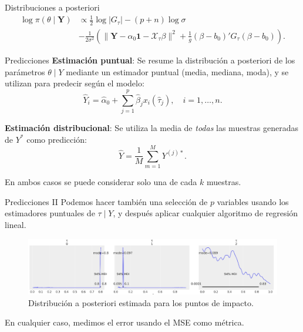 \documentclass[10pt, spanish, professionalfonts]{beamer}
\begin{document}
\begin{frame}{Distribuciones a posteriori}
  \begin{align*}
  \log \pi(\theta\mid \boldsymbol{Y}) &\propto \frac{1}{2}\log |G_\tau| - (p+n)\log \sigma\\
  &-\frac{1}{2\sigma^2} \left(\|\boldsymbol{Y}-\alpha_0\boldsymbol{1} - \mathcal X_\tau\beta\|^2 + \frac{1}{g}(\beta - b_0)'G_\tau(\beta - b_0) \right).
\end{align*}
\end{frame}



\begin{frame}{Predicciones}
  \textbf{Estimación puntual}: Se resume la distribución a posteriori de los parámetros \(\theta\mid Y\) mediante un estimador puntual (media, mediana, moda), y se utilizan para predecir según el modelo:
  \[
  \hat Y_i =\hat \alpha_0 + \sum_{j=1}^p \hat \beta_j x_i(\hat \tau_j), \quad i=1,\dots, n.
  \]

  \textbf{Estimación distribucional}: Se utiliza la media de \textit{todas}  las muestras generadas de \(Y^*\) como predicción:
  \[
    \hat Y = \frac{1}{M}\sum_{m=1}^M Y^{(j)*}.
  \]

  En ambos casos se puede considerar solo una de cada \(k\) muestras.
\end{frame}

\begin{frame}{Predicciones II}
    Podemos hacer también una selección de \(p\) variables usando los estimadores puntuales de \(\tau \mid Y\), y después aplicar cualquier algoritmo de regresión lineal.

    \begin{figure}
      \includegraphics[width=\textwidth]{img/tau_posterior_lin}
      \caption{Distribución a posteriori estimada para los puntos de impacto.}
    \end{figure}

    En cualquier caso, medimos el error usando el MSE como métrica.
\end{frame}
\end{document}
